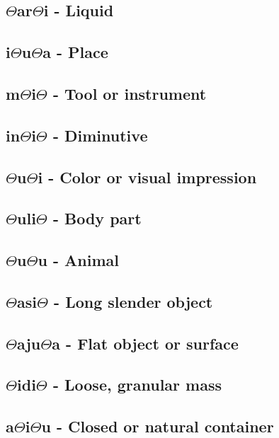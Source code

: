 \documentclass[a4paper,10pt,twoside,openright]{memoir}
\newcommand{\rootpart}{$\Theta$}
\begin{document}
\subsection{\rootpart{}ar\rootpart{}i - Liquid}

\subsection{i\rootpart{}u\rootpart{}a - Place}

\subsection{m\rootpart{}i\rootpart{} - Tool or instrument}

\subsection{in\rootpart{}i\rootpart{} - Diminutive}

\subsection{\rootpart{}u\rootpart{}i - Color or visual impression}

\subsection{\rootpart{}uli\rootpart{} - Body part}

\subsection{\rootpart{}u\rootpart{}u - Animal}

\subsection{\rootpart{}asi\rootpart{} - Long slender object}

\subsection{\rootpart{}aju\rootpart{}a - Flat object or surface}

\subsection{\rootpart{}idi\rootpart{} - Loose, granular mass}

\subsection{a\rootpart{}i\rootpart{}u - Closed or natural container}
\end{document}
